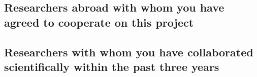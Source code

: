 \subsection{Researchers abroad with whom you have agreed to cooperate on this project}
\label{sec:collab:abroad}

%
%
%

\subsection{Researchers with whom you have collaborated scientifically within the past three years}

